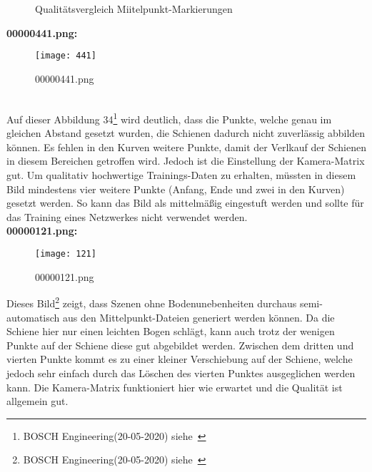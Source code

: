 \noindent
\begin{figure}[h]
    \subfigure[00000441.png]{\texttt{[image: 441]}}
    \subfigure[00000121.png]{\texttt{[image: 121]}}
\subfigure[00000821.png]{\texttt{[image: 821]}}
\subfigure[00000621.png]{\texttt{[image: 621]}}
\subfigure[00000781]{\texttt{[image: 781]}}
\caption{Qualitätsvergleich Miitelpunkt-Markierungen}
\end{figure}
\newpage
\noindent
\textbf {00000441.png:}
\\

\noindent
\begin{figure}[H]
  \texttt{[image: 441]}
  \caption{00000441.png }
\end{figure}
\noindent
\\

\noindent
Auf dieser Abbildung 34\footnote{BOSCH Engineering(20-05-2020) siehe~\cite{0520}} wird deutlich, dass die Punkte, welche genau im gleichen Abstand gesetzt wurden, die Schienen dadurch nicht zuverlässig abbilden können. Es fehlen in den Kurven weitere Punkte, damit der Verlkauf der Schienen in diesem Bereichen getroffen wird. Jedoch ist die Einstellung der Kamera-Matrix gut. Um qualitativ hochwertige Trainings-Daten zu erhalten, müssten in diesem Bild mindestens vier weitere Punkte (Anfang, Ende und zwei in den Kurven) gesetzt werden. So kann das Bild als mittelmäßig eingestuft werden und sollte für das Training eines Netzwerkes nicht verwendet werden.
\\

\noindent
\newpage
\textbf {00000121.png:}
\\

\noindent
\begin{figure}[H]
  \texttt{[image: 121]}
  \caption{00000121.png}
\end{figure}

\noindent
Dieses Bild\footnote{BOSCH Engineering(20-05-2020) siehe~\cite{0520}} zeigt, dass Szenen ohne Bodenunebenheiten durchaus semi-automatisch aus den Mittelpunkt-Dateien generiert werden können. Da die Schiene hier nur einen leichten Bogen schlägt, kann auch trotz der wenigen Punkte auf der Schiene diese gut abgebildet werden. Zwischen dem dritten und vierten Punkte kommt es zu einer kleiner Verschiebung auf der Schiene, welche jedoch sehr einfach durch das Löschen des vierten Punktes ausgeglichen werden kann. Die Kamera-Matrix funktioniert hier wie erwartet und die Qualität ist allgemein gut.
\\

